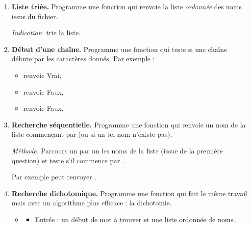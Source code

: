 \documentclass[11pt,class=report,crop=false]{standalone}
\begin{document}
\begin{activite}
	
	
	
	\begin{enumerate}
		\item \textbf{Liste triée.}
		Programme une fonction  qui renvoie la liste \emph{ordonnée} des noms issus du fichier.
		
		\emph{Indication.}  trie la liste.
		
		\item \textbf{Début d'une chaîne.}
		Programme une fonction  qui teste si une chaîne débute par les caractères donnés.
		Par exemple :
		\begin{itemize}
			\item {} renvoie \og{}Vrai\fg{},
			\item {} renvoie \og{}Faux\fg{},
			\item {} renvoie \og{}Faux\fg{}.						
		\end{itemize}
	
		\item \textbf{Recherche séquentielle.}
		Programme une fonction 
		qui renvoie un nom de la liste commençant par  (ou  si un tel nom n'existe pas). 
		
		\emph{Méthode.} Parcours un par un les noms de la liste (issue de la première question) et teste s'il commence par .
		
		Par exemple  peut renvoyer .
		
		\item \textbf{Recherche dichotomique.}
		Programme une fonction  qui fait le même travail mais avec un algorithme plus efficace : la dichotomie.
		
		\begin{algorithme}
			\sauteligne 
			
			\begin{itemize}
				\item 
				\begin{itemize}
					\item Entrée : un début de mot à trouver et une liste ordonnée de noms.
					

\end{itemize}
\end{itemize}
\end{algorithme}
\end{enumerate}
\end{activite}
\end{document}
